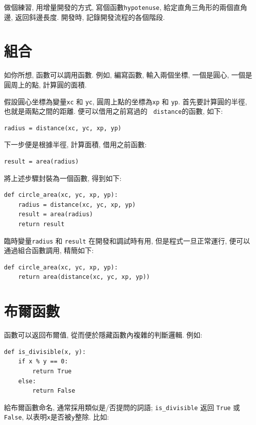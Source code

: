 \documentclass[10pt]{book}
\begin{document}
做個練習, 用增量開發的方式, 寫個函數{\tt hypotenuse}, 
給定直角三角形的兩個直角邊, 返回斜邊長度. 
開發時, 記錄開發流程的各個階段. 



\section{組合}

如你所想, 函數可以調用函數. 
例如, 編寫函數, 輸入兩個坐標, 一個是圓心, 一個是圓周上的點, 
計算圓的面積. 

假設圓心坐標為變量{\tt xc} 和
{\tt yc}, 圓周上點的坐標為{\tt xp} 和 {\tt yp}.
首先要計算圓的半徑, 也就是兩點之間的距離. 
便可以借用之前寫過的 {\tt
distance}的函數, 如下:

\begin{verbatim}
radius = distance(xc, yc, xp, yp)
\end{verbatim}
%
下一步便是根據半徑, 計算面積, 借用之前函數:

\begin{verbatim}
result = area(radius)
\end{verbatim}
%
將上述步驟封裝為一個函數, 得到如下:

\begin{verbatim}
def circle_area(xc, yc, xp, yp):
    radius = distance(xc, yc, xp, yp)
    result = area(radius)
    return result
\end{verbatim}
%
臨時變量{\tt radius} 和 {\tt result} 在開發和調試時有用, 但是程式一旦正常運行, 
便可以通過組合函數調用, 精簡如下:

\begin{verbatim}
def circle_area(xc, yc, xp, yp):
    return area(distance(xc, yc, xp, yp))
\end{verbatim}
%

\section{布爾函數}
\label{boolean}

函數可以返回布爾值, 從而便於隱藏函數內複雜的判斷邏輯.  
例如:

\begin{verbatim}
def is_divisible(x, y):
    if x % y == 0:
        return True
    else:
        return False
\end{verbatim}
%
給布爾函數命名, 通常採用類似是/否提問的詞語; 
\verb"is_divisible" 返回 {\tt True} 或 {\tt False}, 
以表明{\tt x}是否被{\tt y}整除. 
比如:
\end{document}
